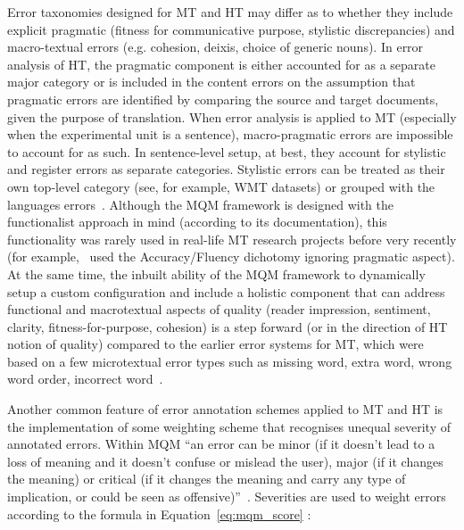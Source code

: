 Error taxonomies designed for MT and HT may differ as to whether they include explicit pragmatic (fitness for communicative purpose, stylistic discrepancies) and macro-textual errors (e.g. cohesion, deixis, choice of generic nouns). In error analysis of HT, the pragmatic component is either accounted for as a separate major category or is included in the content errors on the assumption that pragmatic errors are identified by comparing the source and target documents, given the purpose of translation. 
When error analysis is applied to MT (especially when the experimental unit is a sentence), macro-pragmatic errors are impossible to account for as such. In sentence-level setup, at best, they account for stylistic and register errors as separate categories. Stylistic errors can be treated as their own top-level category (see, for example, WMT datasets) or grouped with the languages errors~\cite[see][]{Zaretskaya2016}. 
Although the MQM framework is designed with the functionalist approach in mind (according to its documentation), %
this functionality was rarely used in real-life MT research projects before very recently (for example,~\citet{SanchezTorron2016} used the Accuracy/Fluency dichotomy ignoring pragmatic aspect). 
At the same time, the inbuilt ability of the MQM framework to dynamically setup a custom configuration and include a holistic component that can address functional and macrotextual aspects of quality (reader impression, sentiment, clarity, fitness-for-purpose, cohesion) is a step forward (or in the direction of HT notion of quality) compared to the earlier error systems for MT, which were based on a few microtextual error types such as missing word, extra word, wrong word order, incorrect word~\cite{Llitjos2005, Vilar2006}. 

Another common feature of error annotation schemes applied to MT and HT is the implementation of some weighting scheme that recognises unequal severity of annotated errors. Within MQM ``an error can be minor (if it doesn't lead to a loss of meaning and it doesn't confuse or mislead the user), major (if it changes the meaning) or critical (if it changes the meaning and carry any type of implication, or could be seen as offensive)''~\cite{Dugast2016}. Severities are used to weight errors according to the formula in Equation~\ref{eq:mqm_score} \cite[from][p.745, who refered to \citet{SanchezTorron2016}]{Specia2020wmt}:

